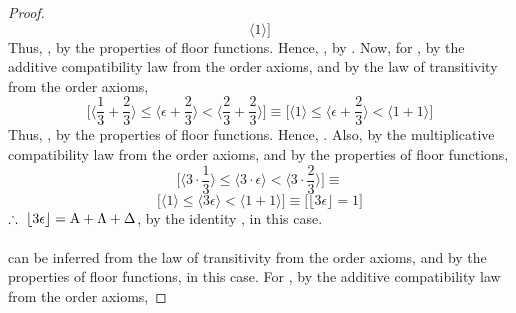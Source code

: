 \documentclass[preview]{standalone}
\begin{document}
\begin{proof}
\begin{equation*}
            \bigg \langle 1 \bigg \rangle
        \bigg]
    \end{equation*}
    Thus, , by the properties of floor functions.
    Hence, , by . 
    Now, for \bm{$\Delta$}, 
    by the additive compatibility law from the order axioms,
    and by the law of transitivity from the order axioms,
    \begin{equation*}
        \bigg[
            \bigg \langle \frac{1}{3} + \frac{2}{3} \bigg \rangle
                \leq 
            \bigg \langle \epsilon + \frac{2}{3} \bigg \rangle 
                < 
            \bigg \langle \frac{2}{3} + \frac{2}{3} \bigg \rangle
        \bigg]
            \equiv
        \bigg[
            \bigg \langle 1 \bigg \rangle
                \leq 
            \bigg \langle \epsilon + \frac{2}{3} \bigg \rangle 
                < 
            \bigg \langle 1 + 1 \bigg \rangle
        \bigg]
    \end{equation*}
    Thus, , by the properties of floor functions. 
    Hence, .
    Also, by the multiplicative compatibility law from the order axioms,
    and by the properties of floor functions,
    \pagebreak
    \begin{equation*}
        \bigg[
            \bigg \langle 3 \cdot \frac{1}{3} \bigg \rangle
                \leq
            \bigg \langle 3 \cdot \epsilon \bigg \rangle
                <
            \bigg \langle 3 \cdot \frac{2}{3} \bigg \rangle
        \bigg]
            \equiv
    \end{equation*}
    \begin{equation*}
        \bigg[
            \Big \langle 1 \Big \rangle
                \leq
            \Big \langle 3 \epsilon \Big \rangle
                <
            \Big \langle 1 + 1 \Big \rangle
        \bigg]
            \equiv
        \bigg[
            \big \lfloor 3 \epsilon \big \rfloor
                =
            1
        \bigg]
    \end{equation*}
    $\therefore \text{\space} \relax{
        \lfloor 3 \epsilon \rfloor
            =
        \mathrm{A} + \Lambda + \Delta
    }$, by the identity , in this case.
    \\ \\
     can be inferred from the law of transitivity from the order axioms,
    and by the properties of floor functions, in this case.
    For \bm{$\Lambda$},
    by the additive compatibility law from the order axioms,

\end{proof}
\end{document}
